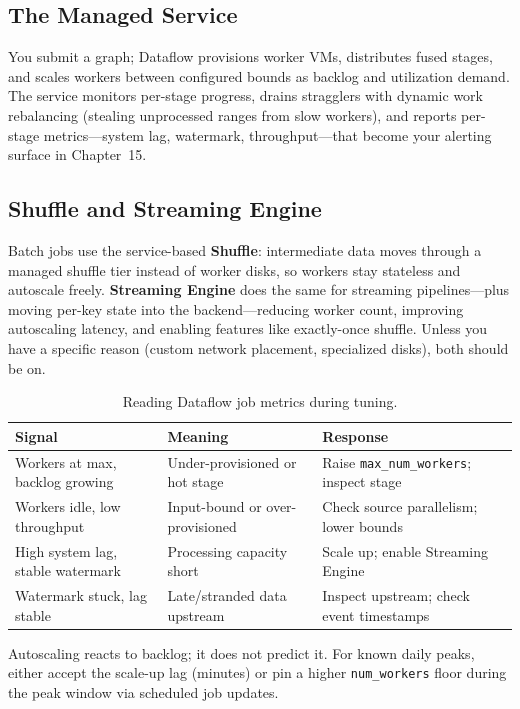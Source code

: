 \subsection{The Managed Service}
You submit a graph; Dataflow provisions worker VMs, distributes fused stages, and scales workers between configured bounds as backlog and utilization demand. The service monitors per-stage progress, drains stragglers with dynamic work rebalancing (stealing unprocessed ranges from slow workers), and reports per-stage metrics---system lag, watermark, throughput---that become your alerting surface in Chapter~15.

\subsection{Shuffle and Streaming Engine}
Batch jobs use the service-based \textbf{Shuffle}: intermediate data moves through a managed shuffle tier instead of worker disks, so workers stay stateless and autoscale freely. \textbf{Streaming Engine} does the same for streaming pipelines---plus moving per-key state into the backend---reducing worker count, improving autoscaling latency, and enabling features like exactly-once shuffle. Unless you have a specific reason (custom network placement, specialized disks), both should be on.

\begin{table}[H]
\centering
\small
\begin{tabular}{@{}p{4.4cm}p{4.4cm}p{4.4cm}@{}} \\
\toprule
\textbf{Signal} & \textbf{Meaning} & \textbf{Response} \\
\midrule
Workers at max, backlog growing & Under-provisioned or hot stage & Raise \texttt{max\_num\_workers}; inspect stage \\
Workers idle, low throughput & Input-bound or over-provisioned & Check source parallelism; lower bounds \\
High system lag, stable watermark & Processing capacity short & Scale up; enable Streaming Engine \\
Watermark stuck, lag stable & Late/stranded data upstream & Inspect upstream; check event timestamps \\
\bottomrule
\end{tabular}
\caption{Reading Dataflow job metrics during tuning.}
\label{tab:ch14-dataflow-metrics}
\end{table}

\begin{tipbox}
Autoscaling reacts to backlog; it does not predict it. For known daily peaks, either accept the scale-up lag (minutes) or pin a higher \texttt{num\_workers} floor during the peak window via scheduled job updates.
\end{tipbox}

